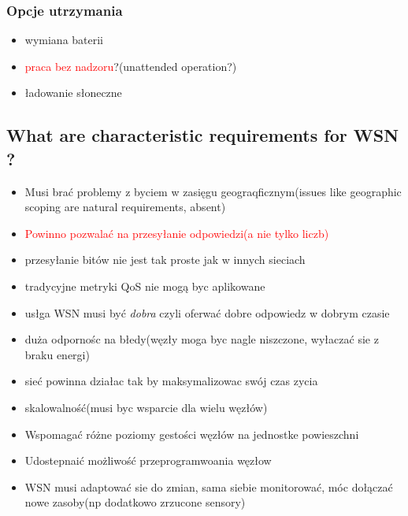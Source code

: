 \subsubsection{Opcje utrzymania}
\begin{itemize}
\item wymiana baterii
\item\textcolor{red}{praca bez nadzoru}?(unattended operation?)
\item ładowanie słoneczne
\end{itemize}
\subsection{What are characteristic requirements for WSN ?}

\begin{itemize}
\item Musi brać problemy z byciem w zasięgu geograqficznym(issues like geographic scoping are natural requirements, absent)
\item \textcolor{red}{Powinno pozwalać na przesyłanie odpowiedzi(a nie tylko liczb)}
\item przesyłanie bitów nie jest tak proste jak w innych sieciach
\item tradycyjne metryki QoS nie mogą byc aplikowane
\item usłga WSN musi być \textit{dobra} czyli oferwać dobre odpowiedz w dobrym czasie
\item duża odpornośc na błedy(węzły moga byc nagle niszczone, wyłaczać sie z braku energi)
\item sieć powinna działac tak by maksymalizowac swój czas zycia
\item skalowalność(musi byc wsparcie dla wielu węzłów)
\item Wspomagać różne poziomy gestości węzłów na jednostke powieszchni
\item Udostepnaić możliwość przeprogramwoania węzłow
\item WSN musi adaptować sie do zmian, sama siebie monitorować, móc dołączać nowe zasoby(np dodatkowo zrzucone sensory)
\end{itemize}
